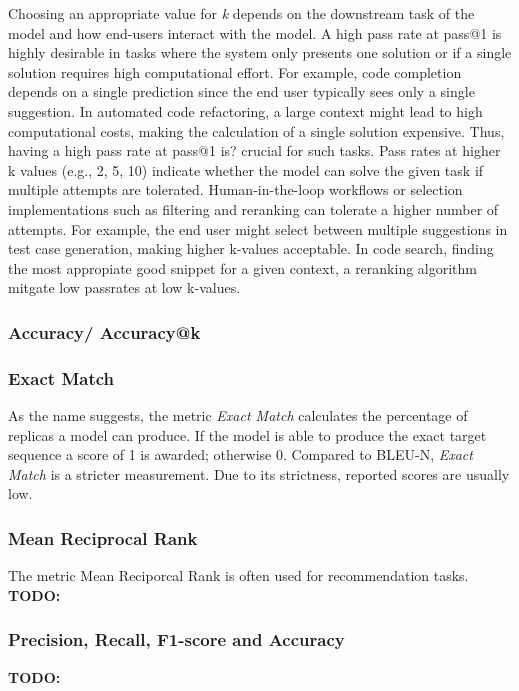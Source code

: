 \documentclass[11pt]{article}
\newcommand{\todo}[1]{{\textbf{TODO:}\ \textit{#1}}} %
\begin{document}
Choosing an appropriate value for \emph{k} depends on the downstream task of the model and how end-users interact with the model.
A high pass rate at pass@1 is highly desirable in tasks where the system only presents one solution or if a single solution requires high computational effort.
For example, code completion depends on a single prediction since the end user typically sees only a single suggestion.
In automated code refactoring, a large context might lead to high computational costs, making the calculation of a single solution expensive.
Thus, having a high pass rate at pass@1 is? crucial for such tasks.
Pass rates at higher k values (e.g., 2, 5, 10) indicate whether the model can solve the given task if multiple attempts are tolerated.
Human-in-the-loop workflows or selection implementations such as filtering and reranking can tolerate a higher number of attempts.
For example, the end user might select between multiple suggestions in test case generation, making higher k-values acceptable.
In code search, finding the most appropiate good snippet for a given context, a reranking algorithm mitgate low passrates at low k-values.

\subsubsection{Accuracy/ Accuracy@k}

\subsubsection{Exact Match}

As the name suggests, the metric \emph{Exact Match} calculates the percentage of replicas a model can produce.
If the model is able to produce the exact target sequence a score of 1 is awarded; otherwise 0.
Compared to BLEU-N, \emph{Exact Match} is a stricter measurement.
Due to its strictness, reported scores are usually low.

\subsubsection{Mean Reciprocal Rank}

The metric Mean Reciporcal Rank is often used for recommendation tasks.
\todo{}

\subsubsection{Precision, Recall, F1-score and Accuracy}
\todo{}
\end{document}
